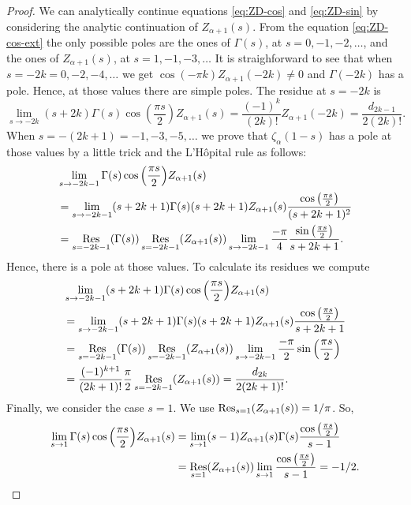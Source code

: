 \documentclass[a4paper]{amsart}
\newcommand{\Res}{\operatornamewithlimits{Res}}
\theoremstyle{plain}
\theoremstyle{definition}
\theoremstyle{remark}
\numberwithin{equation}{section}
\begin{document}
\begin{proof}
We can analytically continue equations \eqref{eq:ZD-cos} and \eqref{eq:ZD-sin} by considering the analytic continuation of $Z_{\alpha+1}(s)$. From the equation \eqref{eq:ZD-cos-ext}
the only possible poles are the ones of $\Gamma(s)$, at $s=0,-1,-2,\dots$, and the ones of $Z_{\alpha+1}(s)$, at $s=1,-1,-3,\dots$ It is straighforward to see that when $s=-2k=0,-2,-4,\dots$ we get $\cos(-\pi k) Z_{\alpha+1}(-2k)\not= 0$ and $\Gamma(-2k)$ has a pole. Hence, at those values there are simple poles. The residue at $s=-2k$ is
\[
\lim_{s\to -2k} (s+2k)\Gamma(s) \cos{\left(\frac{\pi s}{2}\right)} Z_{\alpha+1}(s) = \frac{(-1)^k}{(2k)!} Z_{\alpha+1}(-2k) = \frac{d_{2k-1}}{2(2k)!}.
\] 
When $s=-(2k+1) = -1,-3,-5,\dots$ we prove that $\zeta_\alpha(1-s)$ has a pole at those values by a little trick and the L'H\^opital rule as follows:
\begin{align*}
& \lim_{s\to -2k-1} \Gamma(s) \cos{\left(\frac{\pi s}{2}\right)} 
Z_{\alpha+1}(s) \\
& =\lim_{s\to -2k-1} (s+2k+1)\Gamma(s) (s+2k+1)Z_{\alpha+1}(s) \frac{\cos{\left(\frac{\pi s}{2}\right)}}{(s+2k+1)^2} \\
 & =\Res_{s=-2k-1}(\Gamma(s)) \Res_{s=-2k-1}(Z_{\alpha+1}(s))
 \lim_{s\to -2k-1} \frac{-\pi}{4}\frac{\sin{\left(\frac{\pi s}{2}\right)}}{s+2k+1}.
\end{align*}
Hence, there is a pole at those values. To calculate its residues we compute
\begin{align*}
& \lim_{s\to -2k-1}  (s+2k+1)\Gamma(s) \cos{\left(\frac{\pi s}{2}\right)} Z_{\alpha+1}(s) \\
& =\lim_{s\to -2k-1} (s+2k+1)\Gamma(s) (s+2k+1)Z_{\alpha+1}(s) \frac{\cos{\left(\frac{\pi s}{2}\right)}}{s+2k+1}\\
 & =\Res_{s=-2k-1}(\Gamma(s)) \Res_{s=-2k-1}(Z_{\alpha+1}(s))
 \lim_{s\to -2k-1} \frac{-\pi}{2}\sin{\left(\frac{\pi s}{2}\right)} \\
 & = \frac{(-1)^{k+1}}{(2k+1)!}\frac{\pi}{2}\Res_{s=-2k-1}(Z_{\alpha+1}(s)) = \frac{d_{2k}}{2(2k+1)!}.
\end{align*}
Finally, we consider the case $s=1$. 
We use $\Res_{s=1}(Z_{\alpha+1}(s)) = 1/\pi$. So,
\begin{align*}
\lim_{s\to 1}  \Gamma(s) \cos{\left(\frac{\pi s}{2}\right)} Z_{\alpha+1}(s) 
& = \lim_{s\to 1} (s-1)Z_{\alpha+1}(s)\Gamma(s)
\frac{\cos{\left(\frac{\pi s}{2}\right)}}{s-1}\\
 & = \Res_{s=1}(Z_{\alpha+1}(s))
 \lim_{s\to 1} \frac{\cos{\left(\frac{\pi s}{2}\right)}}{s-1} 
 = -1/2.
 \qedhere
\end{align*}
\end{proof}
\end{document}

